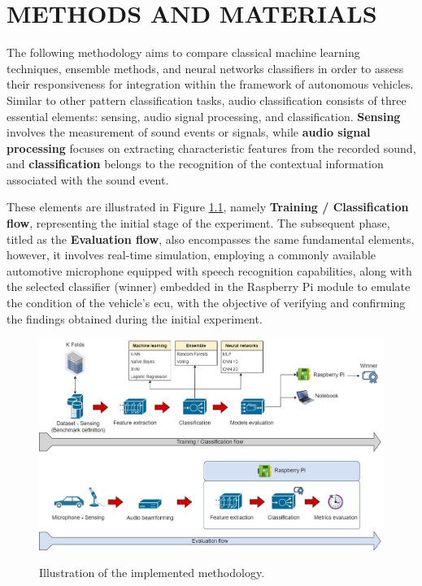 \chapter{METHODS AND MATERIALS}
\label{chp:methods}

The following methodology aims to compare classical machine learning techniques, ensemble methods, and neural networks classifiers in order to assess their responsiveness for integration within the framework of autonomous vehicles. Similar to other pattern classification tasks, audio classification consists of three essential elements: sensing, audio signal processing, and classification. \textbf{Sensing} involves the measurement of sound events or signals, while \textbf{audio signal processing} focuses on extracting characteristic features from the recorded sound, and \textbf{classification} belongs to the recognition of the contextual information associated with the sound event.

These elements are illustrated in Figure \ref{fig:methodology_illustration}, namely \textbf{Training / Classification flow}, representing the initial stage of the experiment. The subsequent phase, titled as the \textbf{Evaluation flow}, also encompasses the same fundamental elements, however, it involves real-time simulation, employing a commonly available automotive microphone equipped with speech recognition capabilities, along with the selected classifier (winner) embedded in the Raspberry Pi module to emulate the condition of the vehicle's \gls{ecu}, with the objective of verifying and confirming the findings obtained during the initial experiment.

\begin{figure}[htbp]
    \raggedright
        \caption{Illustration of the implemented methodology.}
        \includegraphics[width=.95\textwidth]{resources/images/050-methods/Methods_diagram.jpg}
        \label{fig:methodology_illustration}
\end{figure}


